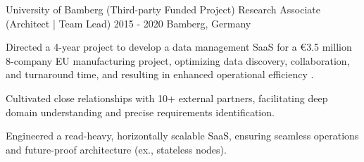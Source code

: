 \clearpage 
{}


\begin{cventries}



  \cventry
    {University of Bamberg (Third-party Funded Project)} %
    {Research Associate (Architect | Team Lead)} %
    {2015 - 2020} %
    {Bamberg, Germany} %
    {
      \begin{cvitems} %
		\item {Directed a 4-year project to develop a data management SaaS for a €3.5 million 8-company EU manufacturing project, optimizing data discovery, collaboration, and turnaround time, and resulting in enhanced operational efficiency .}
		\item {Cultivated close relationships with 10+ external partners, facilitating deep domain understanding and precise requirements identification.}
		\item {Engineered a read-heavy, horizontally scalable SaaS, ensuring seamless operations and future-proof architecture (ex., stateless nodes).}
      \end{cvitems}
    }





\end{cventries}
